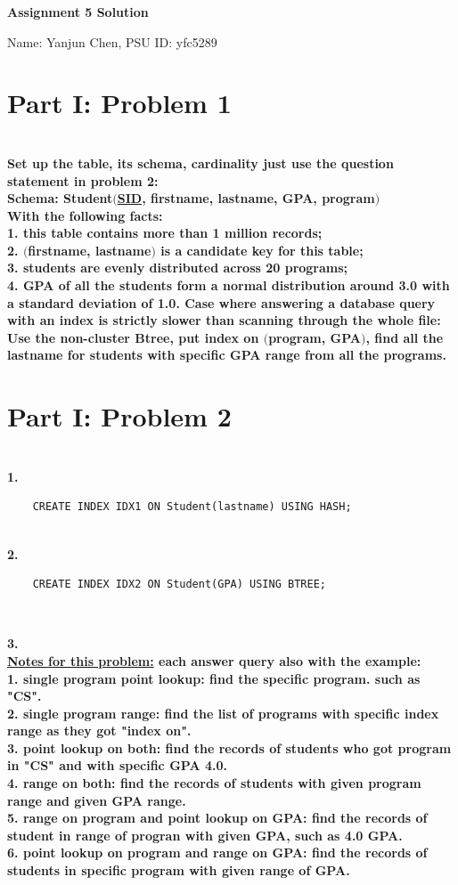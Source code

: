 \documentclass[letterpaper,11pt]{article}
\newcommand{\Paragraph}[1]{~\vspace*{-0.7\baselineskip}\\{\bf #1}}
\begin{document}
\begin{center}
	{\LARGE \bf Assignment 5 Solution}
	
	{\large
	Name: Yanjun Chen, PSU ID: yfc5289}
\end{center}

\section*{Part I: Problem 1}
\Paragraph{
	Set up the table, its schema, cardinality just use the question statement in problem 2: \\
	Schema: Student\((\)\underline{SID}, firstname, lastname, GPA, program\()\)\\
	With the following facts: \\
	1. this table contains more than 1 million records; \\
	2. \((\)firstname, lastname\()\) is a candidate key for this table; \\
	3. students are evenly distributed across 20 programs; \\
	4. GPA of all the students form a normal distribution around 3.0 with a standard deviation of 1.0. 
	Case where answering a database query with an index is strictly slower than scanning through the whole file: \\
	Use the non-cluster Btree, put index on \((\)program, GPA\()\), find all the lastname for students with specific GPA 
	range from all the programs. \\


}

\section*{Part I: Problem 2}
\Paragraph{1. }
\begin{verbatim}
	CREATE INDEX IDX1 ON Student(lastname) USING HASH;
\end{verbatim}

\Paragraph{2.}
\begin{verbatim}
	CREATE INDEX IDX2 ON Student(GPA) USING BTREE;
\end{verbatim}

\Paragraph{3. \\
	\underline{Notes for this problem:} each answer query also with the example: \\
	1. single program point lookup: find the specific program. such as "CS". \\
	2. single program range: find the list of programs with specific index range as they got "index on". \\
	3. point lookup on both: find the records of students who got program in "CS" and with specific GPA 4.0. \\
	4. range on both: find the records of students with given program range and given GPA range. \\
	5. range on program and point lookup on GPA: find the records of student in range of progran with given GPA, such as 4.0 GPA. \\
	6. point lookup on program and range on GPA: find the records of students in specific program with given range of GPA. 

}
\end{document}
